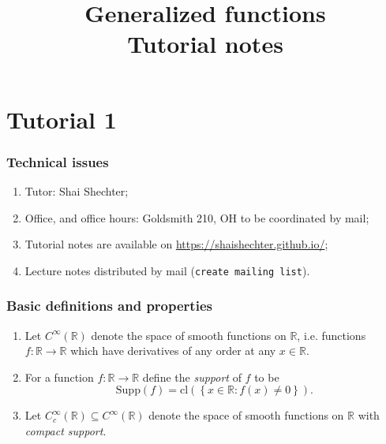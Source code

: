 \documentclass[12pt, draft,reqno,a4paper, twoside]{amsproc}
\title{Generalized functions\\Tutorial notes}
\newcommand{\supp}{\mathrm{Supp}}
\newcommand{\cl}[1]{\mathrm{cl}\left(#1\right)}
\newcommand{\dbR}{\mathbb R}
\newcommand{\set}[1]{\left\{{#1}\right\}}
\begin{document}
\maketitle
\part{Tutorial 1}
\section{Technical issues}
\begin{enumerate}
\item Tutor: Shai Shechter;
\item Office, and office hours: Goldsmith 210, OH to be coordinated by mail;
\item Tutorial notes are available on \url{https://shaishechter.github.io/};
\item Lecture notes distributed by mail ({\tt create mailing list}).
\end{enumerate}

\section{Basic definitions and properties}
\begin{defi}\label{defi:smooth-support}
\begin{enumerate}
\item 
Let $C^\infty(\dbR)$ denote the space of smooth functions on $\dbR$, i.e. functions $f:\dbR\to \dbR$ which have derivatives of any order at any $x\in \dbR$.
\item For a function $f:\dbR\to\dbR$ define the \textit{support} of $f$ to be
\[\supp(f)=\cl{\set{x\in\dbR:f(x)\ne 0}}.\]
\item Let $C_c^\infty(\dbR)\subseteq C^\infty (\dbR)$ denote the space of smooth functions on $\dbR$ with \textit{compact support}.
\end{enumerate}
\end{defi}
\end{document}
